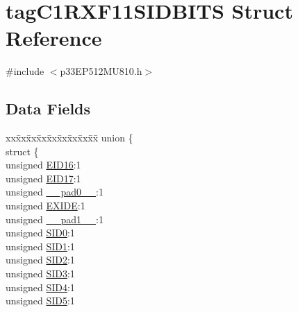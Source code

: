 \hypertarget{structtag_c1_r_x_f11_s_i_d_b_i_t_s}{}\section{tag\+C1\+R\+X\+F11\+S\+I\+D\+B\+I\+TS Struct Reference}
\label{structtag_c1_r_x_f11_s_i_d_b_i_t_s}


{\ttfamily \#include $<$p33\+E\+P512\+M\+U810.\+h$>$}

\subsection*{Data Fields}
\begin{DoxyCompactItemize}
\item 
\begin{tabbing}
xx\=xx\=xx\=xx\=xx\=xx\=xx\=xx\=xx\=\kill
union \{\\
\>struct \{\\
\>\>unsigned \hyperlink{structtag_c1_r_x_f11_s_i_d_b_i_t_s_a6dd5663b0c9838c56db040560ca0efa1}{EID16}:1\\
\>\>unsigned \hyperlink{structtag_c1_r_x_f11_s_i_d_b_i_t_s_aa648615464b0eb29967529333eee9fd9}{EID17}:1\\
\>\>unsigned \hyperlink{structtag_c1_r_x_f11_s_i_d_b_i_t_s_adf71f3d8410c1f1dbbc96680a92c49af}{\_\_pad0\_\_}:1\\
\>\>unsigned \hyperlink{structtag_c1_r_x_f11_s_i_d_b_i_t_s_a09ff1c1be3927220bd3dfbc10edfe243}{EXIDE}:1\\
\>\>unsigned \hyperlink{structtag_c1_r_x_f11_s_i_d_b_i_t_s_acaf2d0924a107ec6e8d2e31febaf66f9}{\_\_pad1\_\_}:1\\
\>\>unsigned \hyperlink{structtag_c1_r_x_f11_s_i_d_b_i_t_s_a1ca276ac15df60e1f7b9a6d0011ade93}{SID0}:1\\
\>\>unsigned \hyperlink{structtag_c1_r_x_f11_s_i_d_b_i_t_s_a3405d354f81391f879648f69f504dfc8}{SID1}:1\\
\>\>unsigned \hyperlink{structtag_c1_r_x_f11_s_i_d_b_i_t_s_ad744966dfc49307f731b7045b01b94e5}{SID2}:1\\
\>\>unsigned \hyperlink{structtag_c1_r_x_f11_s_i_d_b_i_t_s_a9345f3e64720be93e83d8dfc827f3f45}{SID3}:1\\
\>\>unsigned \hyperlink{structtag_c1_r_x_f11_s_i_d_b_i_t_s_aefb106fed4bb40e2c3c71ac612c554e3}{SID4}:1\\
\>\>unsigned \hyperlink{structtag_c1_r_x_f11_s_i_d_b_i_t_s_a0f221b3c9612231686bf87ccdcec8489}{SID5}:1\\

\end{tabbing}
\end{DoxyCompactItemize}
